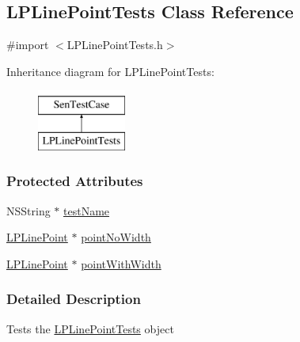 \hypertarget{interface_l_p_line_point_tests}{\subsection{L\-P\-Line\-Point\-Tests Class Reference}
\label{d0/d38/interface_l_p_line_point_tests}
}


{\ttfamily \#import $<$L\-P\-Line\-Point\-Tests.\-h$>$}

Inheritance diagram for L\-P\-Line\-Point\-Tests\-:\begin{figure}[H]
\begin{center}
\leavevmode
\includegraphics[height=2.000000cm]{d0/d38/interface_l_p_line_point_tests}
\end{center}
\end{figure}
\subsubsection*{Protected Attributes}
\begin{DoxyCompactItemize}
\item 
N\-S\-String $\ast$ \hyperlink{interface_l_p_line_point_tests_a64e9eeb3c879bcb9e97b51bdc3aea372}{test\-Name}
\item 
\hyperlink{interface_l_p_line_point}{L\-P\-Line\-Point} $\ast$ \hyperlink{interface_l_p_line_point_tests_a394e0cb6bce4468b8d5dc75bbc93a661}{point\-No\-Width}
\item 
\hyperlink{interface_l_p_line_point}{L\-P\-Line\-Point} $\ast$ \hyperlink{interface_l_p_line_point_tests_ae9ab9ef2f204af865b213e3eab7b81af}{point\-With\-Width}
\end{DoxyCompactItemize}


\subsubsection{Detailed Description}
Tests the \hyperlink{interface_l_p_line_point_tests}{L\-P\-Line\-Point\-Tests} object 

